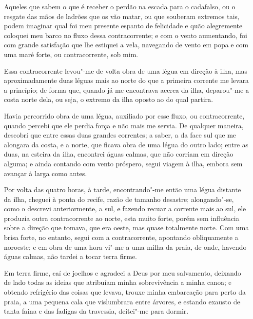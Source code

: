 Aqueles que sabem o que é receber o perdão na escada para o cadafalso,
ou o resgate das mãos de ladrões que os vão matar, ou que souberam
extremos tais, podem imaginar qual foi meu presente espanto de
felicidade e quão alegremente coloquei meu barco no fluxo dessa
contracorrente; e com o vento aumentando, foi com grande satisfação que
lhe estiquei a vela, navegando de vento em popa e com uma maré forte, ou
contracorrente, sob mim.

Essa contracorrente levou"-me de volta obra de uma légua em direção à
ilha, mas aproximadamente duas léguas mais ao norte do que a primeira
corrente me levara a princípio; de forma que, quando já me encontrava
acerca da ilha, deparou"-me a costa norte dela, ou seja, o extremo da
ilha oposto ao do qual partira.

Havia percorrido obra de uma légua, auxiliado por esse fluxo, ou
contracorrente, quando percebi que ele perdia força e não mais me
servia. De qualquer maneira, descobri que entre essas duas grandes
correntes; a saber, a da face sul que me alongara da costa, e a norte,
que ficava obra de uma légua do outro lado; entre as duas, na esteira da
ilha, encontrei águas calmas, que não corriam em direção alguma; e ainda
contando com vento próspero, segui viagem à ilha, embora sem avançar à
larga como antes.

Por volta das quatro horas, à tarde, encontrando"-me então uma légua
distante da ilha, cheguei à ponta do recife, razão de tamanho desastre;
alongando"-se, como o descrevi anteriormente, a sul, e fazendo recuar a
corrente mais ao sul, ele produzia outra contracorrente ao norte, esta
muito forte, porém sem influência sobre a direção que tomava, que era
oeste, mas quase totalmente norte. Com uma brisa forte, no entanto,
segui com a contracorrente, apontando obliquamente a noroeste; e em obra
de uma hora vi"-me a uma milha da praia, de onde, havendo águas calmas,
não tardei a tocar terra firme.

Em terra firme, caí de joelhos e agradeci a Deus por meu salvamento,
deixando de lado todas as ideias que atribuíam minha sobrevivência a
minha canoa; e obtendo refrigério das coisas que levava, trouxe minha
embarcação para perto da praia, a uma pequena cala que vislumbrara entre
árvores, e estando exausto de tanta faina e das fadigas da travessia,
deitei"-me para dormir.

